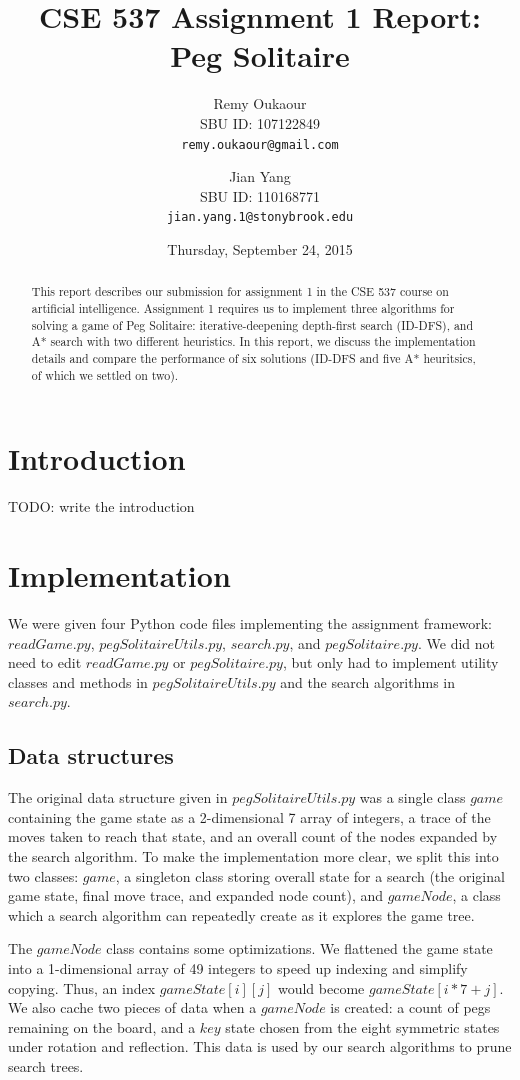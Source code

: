 \documentclass[11pt, letter]{article}
\title{CSE 537 Assignment 1 Report: Peg Solitaire}
\author{
Remy Oukaour \\
	{\small SBU ID: 107122849}\\
	{\small \texttt{remy.oukaour@gmail.com}}
\and
Jian Yang \\
	{\small SBU ID: 110168771}\\
	{\small \texttt{jian.yang.1@stonybrook.edu}}
}
\date{Thursday, September 24, 2015}
\begin{document}
\maketitle

\begin{abstract}
This report describes our submission for assignment 1 in the CSE 537 course on
artificial intelligence. Assignment 1 requires us to implement three algorithms
for solving a game of Peg Solitaire: iterative-deepening depth-first search
(ID-DFS), and A* search with two different heuristics. In this report, we
discuss the implementation details and compare the performance of six solutions
(ID-DFS and five A* heuritsics, of which we settled on two).
\end{abstract}

\section{Introduction}

TODO: write the introduction

\section{Implementation}

We were given four Python code files implementing the assignment framework:
\(readGame.py\), \(pegSolitaireUtils.py\), \(search.py\), and \(pegSolitaire.py\).
We did not need to edit \(readGame.py\) or \(pegSolitaire.py\), but only had to
implement utility classes and methods in \(pegSolitaireUtils.py\) and the search
algorithms in \(search.py\).

\subsection{Data structures}

The original data structure given in \(pegSolitaireUtils.py\) was a single
class \(game\) containing the game state as a 2-dimensional 7 array of
integers, a trace of the moves taken to reach that state, and an overall count
of the nodes expanded by the search algorithm. To make the implementation more
clear, we split this into two classes: \(game\), a singleton class storing
overall state for a search (the original game state, final move trace, and
expanded node count), and \(gameNode\), a class which a search algorithm can
repeatedly create as it explores the game tree.

The \(gameNode\) class contains some optimizations. We flattened the game state
into a 1-dimensional array of 49 integers to speed up indexing and simplify
copying. Thus, an index \(gameState[i][j]\) would become \(gameState[i*7+j]\).
We also cache two pieces of data when a \(gameNode\) is created: a count of
pegs remaining on the board, and a \(key\) state chosen from the eight symmetric
states under rotation and reflection. This data is used by our search algorithms
to prune search trees.
\end{document}
